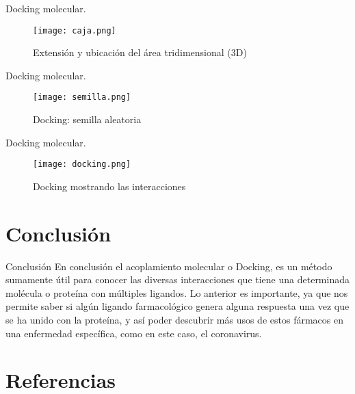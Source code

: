 \documentclass[11pt]{beamer}
\begin{document}
		\begin{frame}{Docking molecular.}
			\justifying
			\begin{figure}[H]
				\centering
				\texttt{[image: caja.png]}
				\caption{Extensión y ubicación del área tridimensional (3D)}
				\label{fig: Figura3}
			\end{figure}
		\end{frame} 
		
		\begin{frame}{Docking molecular.}
			\justifying
			\begin{figure}[H]
				\centering
				\texttt{[image: semilla.png]}
				\caption{Docking: semilla aleatoria}
				\label{fig: Figura4}
			\end{figure}
		\end{frame}
		
		\begin{frame}{Docking molecular.}
			\justifying
			\begin{figure}[H]
				\centering
				\texttt{[image: docking.png]}
				\caption{Docking mostrando las interacciones}
				\label{fig: Figura5}
			\end{figure}
		\end{frame}
	
	\section{Conclusión}
		\begin{frame}{Conclusión}
			\justifying En conclusión el acoplamiento molecular o Docking, es un método sumamente útil para conocer las diversas interacciones que tiene una determinada molécula o proteína con múltiples ligandos. Lo anterior es importante, ya que nos permite saber si algún ligando farmacológico genera alguna respuesta una vez que se ha unido con la proteína, y así poder descubrir más usos de estos fármacos en una enfermedad específica, como en este caso, el coronavirus.
		\end{frame}
	
	

\section{Referencias}
\end{document}

